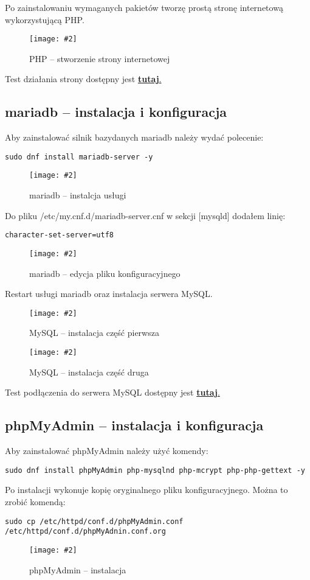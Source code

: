 \documentclass[a4paper]{article}
\newcommand*{\zdj}[2][\textwidth]{\texttt{[image: \#2]}}
\newcommand*{\fg}[4][!htb]{
      \begin{figure*}[#1]
            \zdj{#2}
            \caption[#4]{#3}
      \end{figure*}
}
\begin{document}
Po zainstalowaniu wymaganych pakietów tworzę prostą stronę internetową wykorzystującą PHP.
\fg{contents/configuration/PHP/2.png}{PHP – stworzenie strony internetowej}{PHP – stworzenie strony internetowej}

Test działania strony dostępny jest \hyperref[fig:php-test]{\textbf{tutaj}.}

\newpage
\subsection{mariadb – instalacja i konfiguracja}
Aby zainstalować silnik bazydanych mariadb należy wydać polecenie:
\begin{Verbatim}[frame=single]
sudo dnf install mariadb-server -y
\end{Verbatim}
\fg{contents/configuration/mariadb/1.png}{mariadb – instalcja usługi}{mariadb – instalcja usługi}

Do pliku /etc/my.cnf.d/mariadb-server.cnf w sekcji [mysqld] dodałem linię: 
\begin{Verbatim}[frame=single]
character-set-server=utf8      
\end{Verbatim}
\fg{contents/configuration/mariadb/2.png}{mariadb – edycja pliku konfiguracyjnego}{mariadb – edycja pliku konfiguracyjnego}

\newpage
Restart usługi mariadb oraz instalacja serwera MySQL.
\fg{contents/configuration/mariadb/3.png}{MySQL – instalacja część pierwsza}{MySQL – instalacja część pierwsza}
\fg{contents/configuration/mariadb/4.png}{MySQL – instalacja część druga}{MySQL – instalacja część druga}

Test podłączenia do serwera MySQL dostępny jest \hyperref[fig:mysql-test]{\textbf{tutaj}.}

\newpage
\subsection{phpMyAdmin – instalacja i konfiguracja}
Aby zainstalować phpMyAdmin należy użyć komendy:
\begin{Verbatim}[frame=single,fontsize=\small]
sudo dnf install phpMyAdmin php-mysqlnd php-mcrypt php-php-gettext -y
\end{Verbatim}
\vspace*{-5pt}
Po instalacji wykonuje kopię oryginalnego pliku konfiguracyjnego. Można to zrobić komendą:
\begin{Verbatim}[frame=single,fontsize=\footnotesize]
sudo cp /etc/httpd/conf.d/phpMyAdmin.conf /etc/httpd/conf.d/phpMyAdnin.conf.org
\end{Verbatim}
\vspace*{-10pt}
\fg{contents/configuration/phpMyAdmin/1.png}{phpMyAdmin – instalacja}{phpMyAdmin – instalacja}
\vspace*{-10pt}
\end{document}

